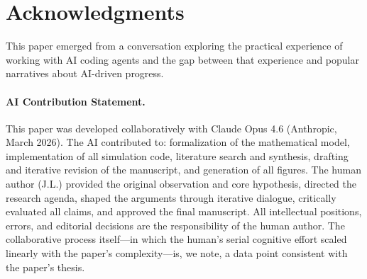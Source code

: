 \documentclass[11pt,a4paper]{article}
\begin{document}
\section*{Acknowledgments}
This paper emerged from a conversation exploring the practical experience of working with AI coding agents and the gap between that experience and popular narratives about AI-driven progress.

\paragraph{AI Contribution Statement.} This paper was developed collaboratively with Claude Opus 4.6 (Anthropic, March 2026). The AI contributed to: formalization of the mathematical model, implementation of all simulation code, literature search and synthesis, drafting and iterative revision of the manuscript, and generation of all figures. The human author (J.L.) provided the original observation and core hypothesis, directed the research agenda, shaped the arguments through iterative dialogue, critically evaluated all claims, and approved the final manuscript. All intellectual positions, errors, and editorial decisions are the responsibility of the human author. The collaborative process itself---in which the human's serial cognitive effort scaled linearly with the paper's complexity---is, we note, a data point consistent with the paper's thesis.
\end{document}
